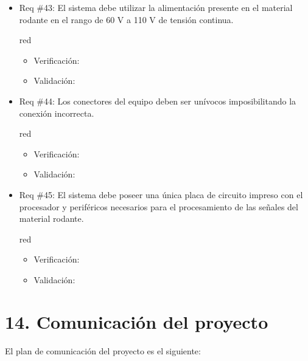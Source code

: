 \documentclass[11pt]{charter}
\begin{document}
\begin{itemize}
\item Req \#43: El sistema debe utilizar la alimentación presente en el material rodante en el rango de 60 V a 110 V de tensión continua.
\begin{consigna}{red}
\begin{itemize}
  \item Verificación:\\
  \item Validación:\\
\end{itemize}
\end{consigna}

\item Req \#44: Los conectores del equipo deben ser unívocos imposibilitando la conexión incorrecta.
\begin{consigna}{red}
\begin{itemize}
  \item Verificación:\\
  \item Validación:\\
\end{itemize}
\end{consigna}

\item Req \#45: El sistema debe poseer una única placa de circuito impreso con el procesador y periféricos necesarios para el procesamiento de las señales del material rodante.
\begin{consigna}{red}
\begin{itemize}
  \item Verificación:\\
  \item Validación:\\
\end{itemize}
\end{consigna}

\end{itemize}

\section{14. Comunicación del proyecto}
\label{sec:comunicaciones}

El plan de comunicación del proyecto es el siguiente:
\end{document}
